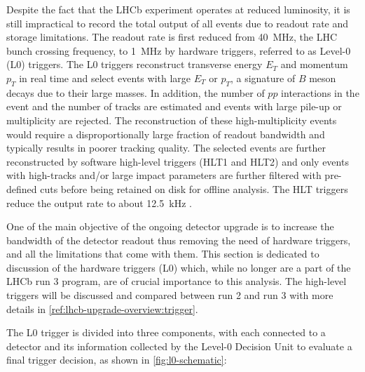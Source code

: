 Despite the fact that the LHCb experiment operates at reduced luminosity,
it is still impractical to record the total output of all events due to readout
rate and storage limitations.
The readout rate is first reduced from 40~MHz,
the LHC bunch crossing frequency,
to 1~MHz by hardware triggers,
referred to as Level-0 (L0) triggers.
The L0 triggers reconstruct transverse energy $E_T$ and momentum $p_T$ in real
time and select events with large $E_T$ or $p_T$,
a signature of $B$ meson decays due to their large masses.
In addition,
the number of $pp$ interactions in the event and the number of tracks are
estimated and events with large pile-up or multiplicity are rejected.
The reconstruction of these high-multiplicity events would require a
disproportionally large fraction of readout bandwidth and typically results in
poorer tracking quality.
The selected events are further reconstructed by software high-level
triggers (HLT1 and HLT2) and only events with high-\pt tracks and/or large
impact parameters are further filtered with pre-defined cuts before being
retained on disk for offline analysis.
The HLT triggers reduce the output rate to about 12.5~kHz
\cite{Dordei:2017rtt}.

One of the main objective of the ongoing detector upgrade is to increase the
bandwidth of the detector readout thus removing the need of hardware triggers,
and all the limitations that come with them.
This section is dedicated to discussion of the hardware triggers (L0) which,
while no longer are a part of the LHCb run 3 program,
are of crucial importance to this analysis.
The high-level triggers will be discussed and compared between run 2 and run 3
with more details in \cref{ref:lhcb-upgrade-overview:trigger}.

The L0 trigger is divided into three components, with each connected to a
detector and its information collected by the Level-0 Decision Unit to evaluate
a final trigger decision, as shown in \cref{fig:l0-schematic}:

